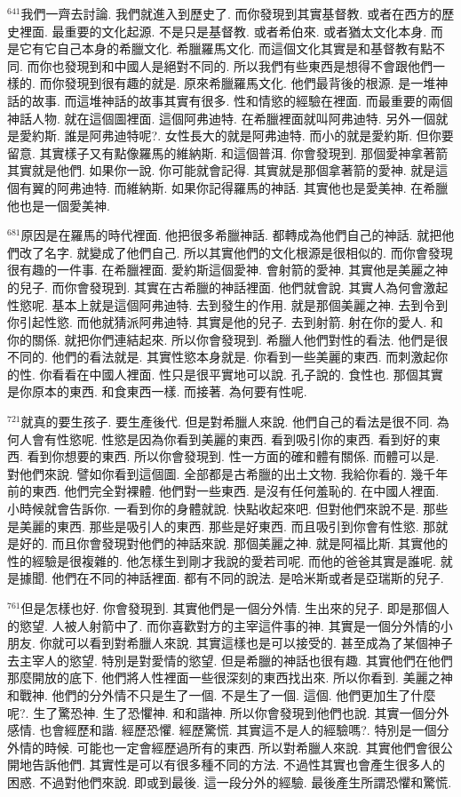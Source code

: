 \documentclass{book}
\begin{document}
$^{641}$我們一齊去討論.
我們就進入到歷史了.
而你發現到其實基督教.
或者在西方的歷史裡面.
最重要的文化起源.
不是只是基督教.
或者希伯來.
或者猶太文化本身.
而是它有它自己本身的希臘文化.
希臘羅馬文化.
而這個文化其實是和基督教有點不同.
而你也發現到和中國人是絕對不同的.
所以我們有些東西是想得不會跟他們一樣的.
而你發現到很有趣的就是.
原來希臘羅馬文化.
他們最背後的根源.
是一堆神話的故事.
而這堆神話的故事其實有很多.
性和情慾的經驗在裡面.
而最重要的兩個神話人物.
就在這個圖裡面.
這個阿弗迪特.
在希臘裡面就叫阿弗迪特.
另外一個就是愛約斯.
誰是阿弗迪特呢?.
女性長大的就是阿弗迪特.
而小的就是愛約斯.
但你要留意.
其實樣子又有點像羅馬的維納斯.
和這個普洱.
你會發現到.
那個愛神拿著箭其實就是他們.
如果你一說.
你可能就會記得.
其實就是那個拿著箭的愛神.
就是這個有翼的阿弗迪特.
而維納斯.
如果你記得羅馬的神話.
其實他也是愛美神.
在希臘他也是一個愛美神.

$^{681}$原因是在羅馬的時代裡面.
他把很多希臘神話.
都轉成為他們自己的神話.
就把他們改了名字.
就變成了他們自己.
所以其實他們的文化根源是很相似的.
而你會發現很有趣的一件事.
在希臘裡面.
愛約斯這個愛神.
會射箭的愛神.
其實他是美麗之神的兒子.
而你會發現到.
其實在古希臘的神話裡面.
他們就會說.
其實人為何會激起性慾呢.
基本上就是這個阿弗迪特.
去到發生的作用.
就是那個美麗之神.
去到令到你引起性慾.
而他就猜派阿弗迪特.
其實是他的兒子.
去到射箭.
射在你的愛人.
和你的關係.
就把你們連結起來.
所以你會發現到.
希臘人他們對性的看法.
他們是很不同的.
他們的看法就是.
其實性慾本身就是.
你看到一些美麗的東西.
而刺激起你的性.
你看看在中國人裡面.
性只是很平實地可以說.
孔子說的.
食性也.
那個其實是你原本的東西.
和食東西一樣.
而接著.
為何要有性呢.

$^{721}$就真的要生孩子.
要生產後代.
但是對希臘人來說.
他們自己的看法是很不同.
為何人會有性慾呢.
性慾是因為你看到美麗的東西.
看到吸引你的東西.
看到好的東西.
看到你想要的東西.
所以你會發現到.
性一方面的確和體有關係.
而體可以是.
對他們來說.
譬如你看到這個圖.
全部都是古希臘的出土文物.
我給你看的.
幾千年前的東西.
他們完全對裸體.
他們對一些東西.
是沒有任何羞恥的.
在中國人裡面.
小時候就會告訴你.
一看到你的身體就說.
快點收起來吧.
但對他們來說不是.
那些是美麗的東西.
那些是吸引人的東西.
那些是好東西.
而且吸引到你會有性慾.
那就是好的.
而且你會發現對他們的神話來說.
那個美麗之神.
就是阿福比斯.
其實他的性的經驗是很複雜的.
他怎樣生到剛才我說的愛若司呢.
而他的爸爸其實是誰呢.
就是據聞.
他們在不同的神話裡面.
都有不同的說法.
是哈米斯或者是亞瑞斯的兒子.

$^{761}$但是怎樣也好.
你會發現到.
其實他們是一個分外情.
生出來的兒子.
即是那個人的慾望.
人被人射箭中了.
而你喜歡對方的主宰這件事的神.
其實是一個分外情的小朋友.
你就可以看到對希臘人來說.
其實這樣也是可以接受的.
甚至成為了某個神子去主宰人的慾望.
特別是對愛情的慾望.
但是希臘的神話也很有趣.
其實他們在他們那麼開放的底下.
他們將人性裡面一些很深刻的東西找出來.
所以你看到.
美麗之神和戰神.
他們的分外情不只是生了一個.
不是生了一個.
這個.
他們更加生了什麼呢?.
生了驚恐神.
生了恐懼神.
和和諧神.
所以你會發現到他們也說.
其實一個分外感情.
也會經歷和諧.
經歷恐懼.
經歷驚慌.
其實這不是人的經驗嗎?.
特別是一個分外情的時候.
可能也一定會經歷過所有的東西.
所以對希臘人來說.
其實他們會很公開地告訴他們.
其實性是可以有很多種不同的方法.
不過性其實也會產生很多人的困惑.
不過對他們來說.
即或到最後.
這一段分外的經驗.
最後產生所謂恐懼和驚慌.
\end{document}
